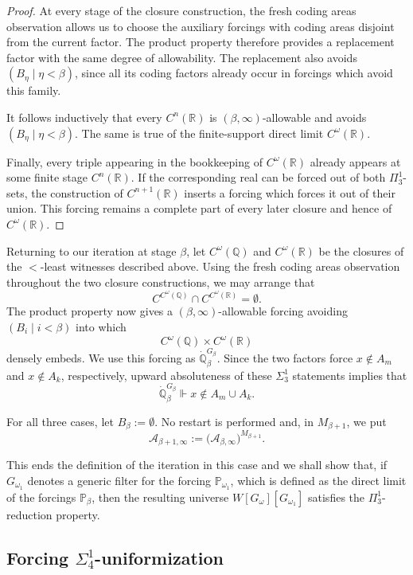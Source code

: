 \documentclass[a4paper,11pt]{article}
\newcommand{\forceP}{\mathbb{P}}
\newcommand{\forceQ}{\mathbb{Q}}
\newcommand{\forceR}{\mathbb{R}}
\begin{document}
\begin{proof}
At every stage of the closure construction, the fresh coding areas observation allows us to choose the auxiliary forcings with coding areas disjoint from the current factor. The product property therefore provides a replacement factor with the same degree of allowability. The replacement also avoids $(B_\eta\mid\eta<\beta)$, since all its coding factors already occur in forcings which avoid this family.

It follows inductively that every $C^n(\forceR)$ is $(\beta,\infty)$-allowable and avoids $(B_\eta\mid\eta<\beta)$. The same is true of the finite-support direct limit $C^\omega(\forceR)$.

Finally, every triple appearing in the bookkeeping of $C^\omega(\forceR)$ already appears at some finite stage $C^n(\forceR)$. If the corresponding real can be forced out of both $\Pi^1_3$-sets, the construction of $C^{n+1}(\forceR)$ inserts a forcing which forces it out of their union. This forcing remains a complete part of every later closure and hence of $C^\omega(\forceR)$.
\end{proof}
Returning to our iteration at stage $\beta$, let $C^\omega(\forceQ)$ and $C^\omega(\forceR)$ be the closures of the $<$-least witnesses described above. Using the fresh coding areas observation throughout the two closure constructions, we may arrange that
\[
C^{C^\omega(\forceQ)}\cap C^{C^\omega(\forceR)}=\emptyset.
\]
The product property now gives a $(\beta,\infty)$-allowable forcing avoiding $(B_i\mid i<\beta)$ into which
\[
C^\omega(\forceQ)\times C^\omega(\forceR)
\]
densely embeds. We use this forcing as $\dot{\forceQ}_\beta^{G_\beta}$. Since the two factors force $x\notin A_m$ and $x\notin A_k$, respectively, upward absoluteness of these $\Sigma^1_3$ statements implies that
\[
\dot{\forceQ}_\beta^{G_\beta}\Vdash x\notin A_m\cup A_k.
\]

For all three cases, let $B_\beta:=\emptyset$. No restart is performed and, in $M_{\beta+1}$, we put
\[
\mathcal A_{\beta+1,\infty}
:=\bigl(\mathcal A_{\beta,\infty}\bigr)^{M_{\beta+1}}.
\]

This ends the definition of the iteration in this case and we shall show that, if $G_{\omega_1}$ denotes a generic filter for the forcing $\forceP_{\omega_1}$, which is defined as the direct limit of the forcings $\forceP_\beta$, then the resulting universe $W[G_\omega][G_{\omega_1}]$ satisfies the $\Pi^1_3$-reduction property.
\subsection{Forcing \texorpdfstring{$\Sigma^1_4$}{Sigma14}-uniformization}
\end{document}

